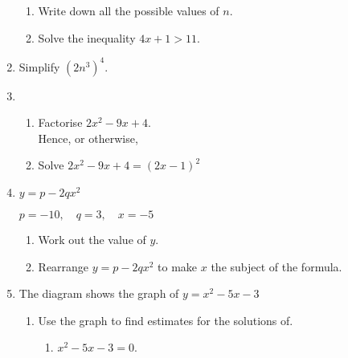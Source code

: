\begin{enumerate}
  \begin{enumerate}
    \item Write down all the possible values of $n$.\strch
    \item Solve the inequality	$4x + 1 > 11$.\strch
  \end{enumerate}
  \item Simplify $(2n^3)^4$.\strch
  \item %
  \begin{enumerate}
    \item Factorise $2x^2 - 9x + 4$.\strch\\
    Hence, or otherwise,
    \item Solve $2x^2 - 9x + 4 = (2x - 1)^2$\strch
  \end{enumerate}
  \newpage
  \item $y = p - 2qx^2$\par
  $p = -10,\quad q = 3,\quad	x = -5$    
  \begin{enumerate}
    \item Work out the value of $y$.\strch
    \item Rearrange $y = p - 2qx^2$ to make $x$ the subject of the formula.\strch
  \end{enumerate}
  \item The diagram shows the graph of $y = x^2 - 5x - 3$
  \begin{figure}[H]
    \centering
  \end{figure}
  \newpage
  \begin{enumerate}
    \item Use the graph to find estimates for the solutions of.
    \begin{enumerate}
      \item $x^2 - 5x - 3 = 0$.\strch

\end{enumerate}
\end{enumerate}
\end{enumerate}
